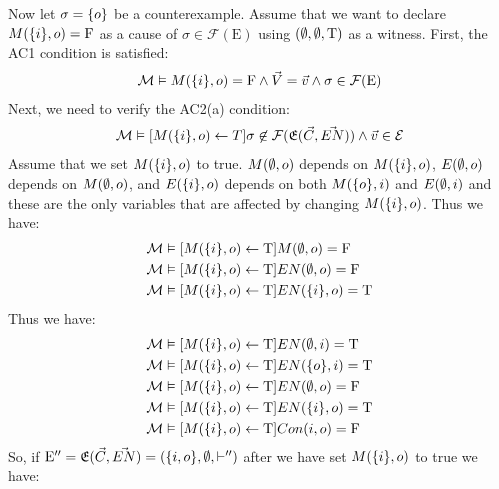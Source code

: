 \begin{example}
\begin{center}
    \end{center}
    Now let $\sigma = \{o\}$ be a counterexample.
    Assume that we want to declare $M(\{i\},o) = \mathrm{F}$ as a cause of
    $\sigma \in \mathcal{F}(\mathrm{E})$ using $(\emptyset,\emptyset,\mathrm{T})$ as a witness.
    First, the AC1 condition is satisfied:
    \begin{align*}
        \mathcal{M} \vDash M(\{i\},o) = \mathrm{F}
        \wedge \vec V = \vec v
        \wedge \sigma \in \mathcal{F}(\mathrm{E})
    \end{align*}
    Next, we need to verify the AC2(a) condition:
    \begin{align*}
        \mathcal{M} \vDash [M(\{i\},o) \leftarrow T] \sigma \not \in \mathcal{F}(\mathfrak{E}(\vec C,\vec {EN}))
        \wedge \vec v \in \mathcal{E}
    \end{align*}
    Assume that we set $M(\{i\},o)$ to true.
    $M(\emptyset,o)$ depends on $M(\{i\},o)$, $E(\emptyset,o)$ depends on $M(\emptyset,o)$, and
    $E(\{i\},o)$ depends on both $M(\{o\},i)$ and $E(\emptyset,i)$
    and these are the only variables that are affected by changing
    $M(\{i\},o)$.
    Thus we have:
    \begin{align*}
        \mathcal{M} & \vDash [M(\{i\},o)\leftarrow \mathrm{T}] M(\emptyset,o) = \mathrm{F}     \\
        \mathcal{M} & \vDash [M(\{i\},o)\leftarrow \mathrm{T}] EN(\emptyset,o) = \mathrm{F}    \\
        \mathcal{M} & \vDash [M(\{i\},o)\leftarrow \mathrm{T}] EN(\{i\},o) = \mathrm{T}
    \end{align*}
    Thus we have:
    \begin{align*}
        \mathcal{M} & \vDash [M(\{i\},o)\leftarrow \mathrm{T}]EN(\emptyset,i) = \mathrm{T}    \\
        \mathcal{M} & \vDash [M(\{i\},o)\leftarrow \mathrm{T}]EN(\{o\},i) = \mathrm{T} \\
        \mathcal{M} & \vDash [M(\{i\},o)\leftarrow \mathrm{T}]EN(\emptyset,o) = \mathrm{F}    \\
        \mathcal{M} & \vDash [M(\{i\},o)\leftarrow \mathrm{T}]EN(\{i\},o) = \mathrm{T} \\
        \mathcal{M} & \vDash [M(\{i\},o)\leftarrow \mathrm{T}]Con(i,o) = \mathrm{F}
    \end{align*}
    So, if $\mathrm{E}'' = \mathfrak{E}(\vec C,\vec {EN}) = (\{i,o\},\emptyset, \vdash'')$
    after we have set $M(\{i\},o)$ to true we have:
    \begin{align*}

\end{align*}
\end{example}
